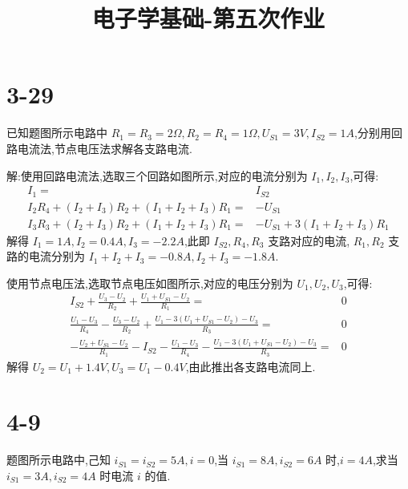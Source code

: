 
\usepackage{../../homeworks_preamble}
\title{电子学基础-第五次作业}


    \maketitle
    \section{3-29} 已知题图所示电路中 $R_1=R_3=2\Omega,R_2=R_4=1\Omega,U_{S1}=3V,I_{S2}=1A$,分别用回路电流法,节点电压法求解各支路电流.
    \begin{figure}[ht]
        \centering
        \label{figure:01}
    \end{figure}

        解:使用回路电流法,选取三个回路如图所示,对应的电流分别为 $I_1,I_2,I_3$,可得:
        \begin{align}
            I_1=&I_{S 2}\\
            I_2R_4+(I_2+I_3)R_2+(I_1+I_2+I_3)R_1=&-U_{S 1}\\
            I_3R_3+(I_2+I_3)R_2+(I_1+I_2+I_3)R_1=&-U_{S 1}+3(I_1+I_2+I_3)R_1
        \end{align}
        解得 $I_1=1A,I_2=0.4A,I_3=-2.2A$,此即 $I_{S 2},R_4,R_3$ 支路对应的电流, $R_1,R_2$ 支路的电流分别为 $I_1+I_2+I_3=-0.8A,I_2+I_3=-1.8A$.

        使用节点电压法,选取节点电压如图所示,对应的电压分别为 $U_1,U_2,U_3$,可得:
        \begin{align}
            I_{S 2}+\frac{U_3-U_2}{R_2}+\frac{U_1+U_{S 1}-U_2}{R_1}=&0\\
            \frac{U_1-U_3}{R_4}-\frac{U_3-U_2}{R_2}+\frac{U_1-3(U_1+U_{S 1}-U_2)-U_3}{R_3}=&0\\
            -\frac{U_2+U_{S 1}-U_2}{R_1}-I_{S 2}-\frac{U_1-U_3}{R_4}-\frac{U_1-3(U_1+U_{S 1}-U_2)-U_3}{R_3}=&0
        \end{align}
        解得 $U_2=U_1+1.4V,U_3=U_1-0.4V$,由此推出各支路电流同上.
        \section{4-9} 题图所示电路中,己知 $i_{S 1}=i_{S 2}=5A,i=0$,当 $i_{S 1}=8A,i_{S 2}=6A$ 时,$i=4A$,求当 $i_{S 1}=3A,i_{S 2}=4A$ 时电流 $i$ 的值.
        \begin{figure}[ht]
            \centering
            \label{figure:02}
        \end{figure}

